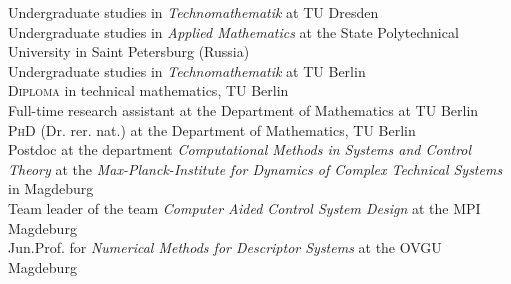  Undergraduate studies in \emph{Technomathematik} at TU Dresden \\
 Undergraduate studies in \emph{Applied Mathematics} at the State Polytechnical University in Saint Petersburg (Russia) \\
 Undergraduate studies in \emph{Technomathematik} at TU Berlin \\
\textsc{Diploma} in technical mathematics, TU Berlin\\
Full-time research assistant at the Department of Mathematics at TU Berlin\\
\textsc{PhD} (Dr. rer. nat.) at the Department of Mathematics, TU Berlin\\
Postdoc at the department \emph{Computational Methods in Systems and Control Theory} at the \emph{Max-Planck-Institute for Dynamics of Complex Technical Systems} in Magdeburg\\
Team leader of the team \emph{Computer Aided Control System Design} at the MPI Magdeburg\\
Jun.Prof. for \emph{Numerical Methods for Descriptor Systems} at the OVGU Magdeburg\\



